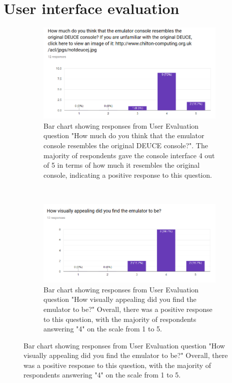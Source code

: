 \documentclass{l4proj}
\begin{document}
\section{User interface evaluation}

\begin{figure}[!t]
	\centering
	\begin{subfigure}[t]{0.45\textwidth}
		\includegraphics[width=\textwidth]{images/chart-1}
		\caption{Bar chart showing responses from User Evaluation question "How much do you think that the emulator console resembles the original DEUCE console?". The majority of respondents gave the console interface 4 out of 5 in terms of how much it resembles the original console, indicating a positive response to this question.}
		\label{fig:chart-1}
	\end{subfigure}
	~ %
	\begin{subfigure}[t]{0.45\textwidth}
		\includegraphics[width=\textwidth]{images/chart-2}
		\caption{Bar chart showing responses from User Evaluation question "How visually appealing did you find the emulator to be?" Overall, there was a positive response to this question, with the majority of respondents answering "4" on the scale from 1 to 5.}

\end{subfigure}
\end{figure}
\end{document}
